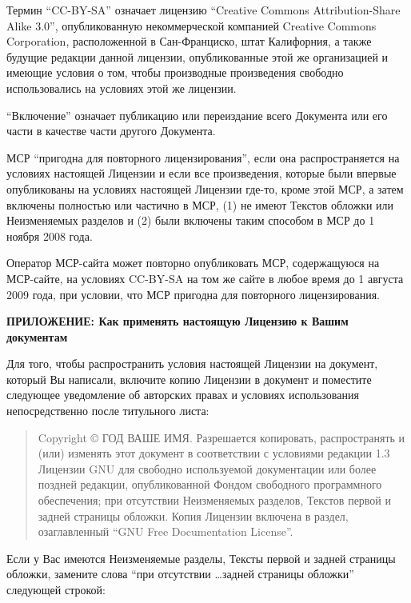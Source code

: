 Термин \enquote{CC-BY-SA} означает лицензию \enquote{Creative Commons
  Attribution-Share Alike 3.0}, опубликованную некоммерческой
компанией Creative Commons Corporation, расположенной в Сан-Франциско,
штат Калифорния, а также будущие редакции данной лицензии,
опубликованные этой же организацией и имеющие условия о том, чтобы
производные произведения свободно использовались на условиях этой же
лицензии.

\enquote{Включение} означает публикацию или переиздание всего
Документа или его части в качестве части другого Документа.

МСР \enquote{пригодна для повторного лицензирования}, если она
распространяется на условиях настоящей Лицензии и если все
произведения, которые были впервые опубликованы на условиях настоящей
Лицензии где-то, кроме этой МСР, а затем включены полностью или
частично в МСР, (1) не имеют Текстов обложки или Неизменяемых разделов
и (2) были включены таким способом в МСР до 1 ноября 2008 года.

Оператор МСР-сайта может повторно опубликовать МСР, содержащуюся на
МСР-сайте, на условиях CC-BY-SA на том же сайте в любое время до 1
августа 2009 года, при условии, что МСР пригодна для повторного
лицензирования.

\begin{center}
{\Large\bf ПРИЛОЖЕНИЕ: Как применять настоящую Лицензию к Вашим документам\par}
\end{center}

Для того, чтобы распространить условия настоящей Лицензии на документ,
который Вы написали, включите копию Лицензии в документ и поместите
следующее уведомление об авторских правах и условиях использования
непосредственно после титульного листа:

\bigskip
\begin{quote}
Copyright \copyright{} ГОД ВАШЕ ИМЯ. Разрешается копировать,
распространять и (или) изменять этот документ в соответствии с
условиями редакции 1.3 Лицензии GNU для свободно используемой
документации или более поздней редакции, опубликованной Фондом
свободного программного обеспечения; при отсутствии Неизменяемых
разделов, Текстов первой и задней страницы обложки. Копия Лицензии
включена в раздел, озаглавленный \enquote{GNU Free Documentation
License}.
\end{quote}
\bigskip

Если у Вас имеются Неизменяемые разделы, Тексты первой и задней
страницы обложки, замените слова \enquote{при отсутствии \dots задней
страницы обложки} следующей строкой:

